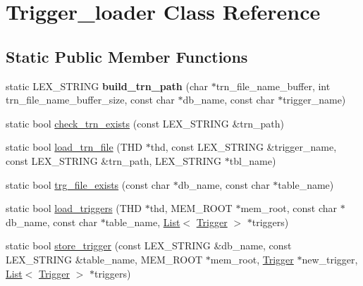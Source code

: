 \hypertarget{classTrigger__loader}{}\section{Trigger\+\_\+loader Class Reference}
\label{classTrigger__loader}
\subsection*{Static Public Member Functions}
\begin{DoxyCompactItemize}
\item 
\mbox{\label{classTrigger__loader_a594c1281a407ec813ae34ab4490d420b}} 
static L\+E\+X\+\_\+\+S\+T\+R\+I\+NG {\bfseries build\+\_\+trn\+\_\+path} (char $\ast$trn\+\_\+file\+\_\+name\+\_\+buffer, int trn\+\_\+file\+\_\+name\+\_\+buffer\+\_\+size, const char $\ast$db\+\_\+name, const char $\ast$trigger\+\_\+name)
\item 
static bool \mbox{\hyperlink{classTrigger__loader_a4c302b0917c9d536dcb568cde72870e9}{check\+\_\+trn\+\_\+exists}} (const L\+E\+X\+\_\+\+S\+T\+R\+I\+NG \&trn\+\_\+path)
\item 
static bool \mbox{\hyperlink{classTrigger__loader_a57fa4348f9ba55ac5880d44422cadea2}{load\+\_\+trn\+\_\+file}} (T\+HD $\ast$thd, const L\+E\+X\+\_\+\+S\+T\+R\+I\+NG \&trigger\+\_\+name, const L\+E\+X\+\_\+\+S\+T\+R\+I\+NG \&trn\+\_\+path, L\+E\+X\+\_\+\+S\+T\+R\+I\+NG $\ast$tbl\+\_\+name)
\item 
static bool \mbox{\hyperlink{classTrigger__loader_a7f8cea2fa784dfa7b89011c619653a1f}{trg\+\_\+file\+\_\+exists}} (const char $\ast$db\+\_\+name, const char $\ast$table\+\_\+name)
\item 
static bool \mbox{\hyperlink{classTrigger__loader_a3a4857082c9d76bb2224df770f54f416}{load\+\_\+triggers}} (T\+HD $\ast$thd, M\+E\+M\+\_\+\+R\+O\+OT $\ast$mem\+\_\+root, const char $\ast$db\+\_\+name, const char $\ast$table\+\_\+name, \mbox{\hyperlink{classList}{List}}$<$ \mbox{\hyperlink{classTrigger}{Trigger}} $>$ $\ast$triggers)
\item 
static bool \mbox{\hyperlink{classTrigger__loader_af75d501de3f2db52638da4d58368bc00}{store\+\_\+trigger}} (const L\+E\+X\+\_\+\+S\+T\+R\+I\+NG \&db\+\_\+name, const L\+E\+X\+\_\+\+S\+T\+R\+I\+NG \&table\+\_\+name, M\+E\+M\+\_\+\+R\+O\+OT $\ast$mem\+\_\+root, \mbox{\hyperlink{classTrigger}{Trigger}} $\ast$new\+\_\+trigger, \mbox{\hyperlink{classList}{List}}$<$ \mbox{\hyperlink{classTrigger}{Trigger}} $>$ $\ast$triggers)

\end{DoxyCompactItemize}
